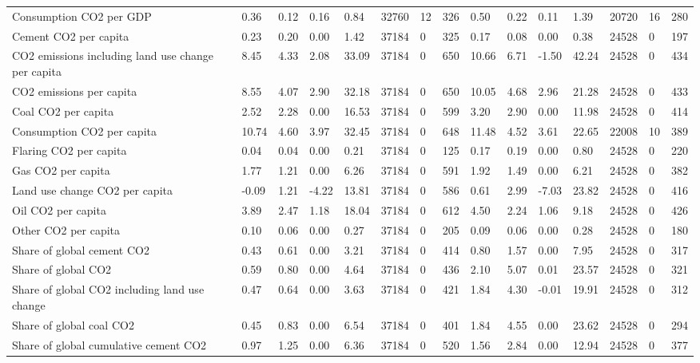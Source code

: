 \begin{longtable}{lllllllllllllll}
\addlinespace
Consumption CO2 per GDP & 0.36 & 0.12 & 0.16 & 0.84 & 32760 & 12 & 326 & 0.50 & 0.22 & 0.11 & 1.39 & 20720 & 16 & 280\\
Cement CO2 per capita & 0.23 & 0.20 & 0.00 & 1.42 & 37184 & 0 & 325 & 0.17 & 0.08 & 0.00 & 0.38 & 24528 & 0 & 197\\
CO2 emissions including land use change per capita & 8.45 & 4.33 & 2.08 & 33.09 & 37184 & 0 & 650 & 10.66 & 6.71 & -1.50 & 42.24 & 24528 & 0 & 434\\
CO2 emissions per capita & 8.55 & 4.07 & 2.90 & 32.18 & 37184 & 0 & 650 & 10.05 & 4.68 & 2.96 & 21.28 & 24528 & 0 & 433\\
Coal CO2 per capita & 2.52 & 2.28 & 0.00 & 16.53 & 37184 & 0 & 599 & 3.20 & 2.90 & 0.00 & 11.98 & 24528 & 0 & 414\\
\addlinespace
Consumption CO2 per capita & 10.74 & 4.60 & 3.97 & 32.45 & 37184 & 0 & 648 & 11.48 & 4.52 & 3.61 & 22.65 & 22008 & 10 & 389\\
Flaring CO2 per capita & 0.04 & 0.04 & 0.00 & 0.21 & 37184 & 0 & 125 & 0.17 & 0.19 & 0.00 & 0.80 & 24528 & 0 & 220\\
Gas CO2 per capita & 1.77 & 1.21 & 0.00 & 6.26 & 37184 & 0 & 591 & 1.92 & 1.49 & 0.00 & 6.21 & 24528 & 0 & 382\\
Land use change CO2 per capita & -0.09 & 1.21 & -4.22 & 13.81 & 37184 & 0 & 586 & 0.61 & 2.99 & -7.03 & 23.82 & 24528 & 0 & 416\\
Oil CO2 per capita & 3.89 & 2.47 & 1.18 & 18.04 & 37184 & 0 & 612 & 4.50 & 2.24 & 1.06 & 9.18 & 24528 & 0 & 426\\
\addlinespace
Other CO2 per capita & 0.10 & 0.06 & 0.00 & 0.27 & 37184 & 0 & 205 & 0.09 & 0.06 & 0.00 & 0.28 & 24528 & 0 & 180\\
Share of global cement CO2 & 0.43 & 0.61 & 0.00 & 3.21 & 37184 & 0 & 414 & 0.80 & 1.57 & 0.00 & 7.95 & 24528 & 0 & 317\\
Share of global CO2 & 0.59 & 0.80 & 0.00 & 4.64 & 37184 & 0 & 436 & 2.10 & 5.07 & 0.01 & 23.57 & 24528 & 0 & 321\\
Share of global CO2 including land use change & 0.47 & 0.64 & 0.00 & 3.63 & 37184 & 0 & 421 & 1.84 & 4.30 & -0.01 & 19.91 & 24528 & 0 & 312\\
Share of global coal CO2 & 0.45 & 0.83 & 0.00 & 6.54 & 37184 & 0 & 401 & 1.84 & 4.55 & 0.00 & 23.62 & 24528 & 0 & 294\\
\addlinespace
Share of global cumulative cement CO2 & 0.97 & 1.25 & 0.00 & 6.36 & 37184 & 0 & 520 & 1.56 & 2.84 & 0.00 & 12.94 & 24528 & 0 & 377\\

\end{longtable}

